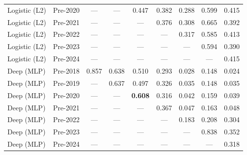 \begin{table}[htbp]
{\begin{tabular}{l lccccccc}
Logistic (L2) & Pre-2020 & --- & --- & 0.447 & 0.382 & 0.288 & 0.599 & 0.415 \\
Logistic (L2) & Pre-2021 & --- & --- & --- & 0.376 & 0.308 & 0.665 & 0.392 \\
Logistic (L2) & Pre-2022 & --- & --- & --- & --- & 0.317 & 0.585 & 0.413 \\
Logistic (L2) & Pre-2023 & --- & --- & --- & --- & --- & 0.594 & 0.390 \\
Logistic (L2) & Pre-2024 & --- & --- & --- & --- & --- & --- & 0.415 \\
Deep (MLP) & Pre-2018 & 0.857 & 0.638 & 0.510 & 0.293 & 0.028 & 0.148 & 0.024 \\
Deep (MLP) & Pre-2019 & --- & 0.637 & 0.497 & 0.326 & 0.035 & 0.148 & 0.035 \\
Deep (MLP) & Pre-2020 & --- & --- & \textbf{0.608} & 0.316 & 0.042 & 0.159 & 0.039 \\
Deep (MLP) & Pre-2021 & --- & --- & --- & 0.367 & 0.047 & 0.163 & 0.048 \\
Deep (MLP) & Pre-2022 & --- & --- & --- & --- & 0.183 & 0.208 & 0.304 \\
Deep (MLP) & Pre-2023 & --- & --- & --- & --- & --- & 0.838 & 0.352 \\
Deep (MLP) & Pre-2024 & --- & --- & --- & --- & --- & --- & 0.318 \\
\bottomrule
\end{tabular}%
}
\end{table}